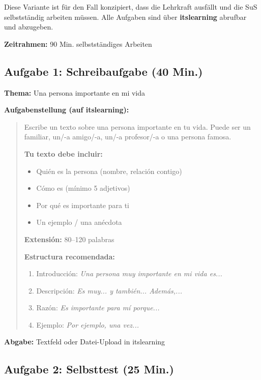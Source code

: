 \documentclass[11pt,a4paper]{article}
\begin{document}
\begin{onlinebox}
Diese Variante ist für den Fall konzipiert, dass die Lehrkraft ausfällt und die SuS selbstständig arbeiten müssen. Alle Aufgaben sind über \textbf{itslearning} abrufbar und abzugeben.

\textbf{Zeitrahmen:} 90 Min. selbstständiges Arbeiten
\end{onlinebox}

\subsection{Aufgabe 1: Schreibaufgabe (40 Min.)}

\textbf{Thema:} \glqq{}Una persona importante en mi vida\grqq{}

\textbf{Aufgabenstellung (auf itslearning):}
\begin{quote}
Escribe un texto sobre una persona importante en tu vida. Puede ser un familiar, un/-a amigo/-a, un/-a profesor/-a o una persona famosa.

\textbf{Tu texto debe incluir:}
\begin{itemize}
    \item Quién es la persona (nombre, relación contigo)
    \item Cómo es (mínimo 5 adjetivos)
    \item Por qué es importante para ti
    \item Un ejemplo / una anécdota
\end{itemize}

\textbf{Extensión:} 80--120 palabras

\textbf{Estructura recomendada:}
\begin{enumerate}
    \item Introducción: \textit{Una persona muy importante en mi vida es...}
    \item Descripción: \textit{Es muy... y también... Además,...}
    \item Razón: \textit{Es importante para mí porque...}
    \item Ejemplo: \textit{Por ejemplo, una vez...}
\end{enumerate}
\end{quote}

\textbf{Abgabe:} Textfeld oder Datei-Upload in itslearning

\subsection{Aufgabe 2: Selbsttest (25 Min.)}
\end{document}

